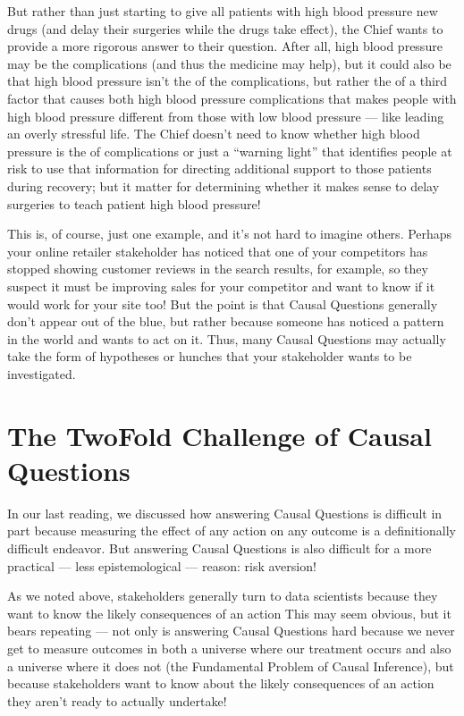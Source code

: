 \documentclass[letterpaper,10pt,english]{jupyterBook}
\begin{document}
\sphinxAtStartPar
But rather than just starting to give all patients with high blood pressure new drugs (and delay their surgeries while the drugs take effect), the Chief wants  to provide a more rigorous answer to their question. After all, high blood pressure may be  the complications (and thus the medicine may help), but it could also be that high blood pressure isn’t the  of the complications, but rather the  of a third factor that causes both high blood pressure  complications that makes people with high blood pressure different from those with low blood pressure — like leading an overly stressful life. The Chief doesn’t need to know whether high blood pressure is the  of complications or just a “warning light” that identifies people at risk to use that information for directing additional support to those patients during recovery; but it  matter for determining whether it makes sense to delay surgeries to teach patient high blood pressure!

\sphinxAtStartPar
This is, of course, just one example, and it’s not hard to imagine others. Perhaps your online retailer stakeholder has noticed that one of your competitors has stopped showing customer reviews in the search results, for example, so they suspect it must be improving sales for your competitor and want to know if it would work for your site too! But the point is that Causal Questions generally don’t appear out of the blue, but rather because someone has noticed a pattern in the world and wants to act on it. Thus, many Causal Questions may actually take the form of hypotheses or hunches that your stakeholder wants to be investigated.


\section{The Two\sphinxhyphen{}Fold Challenge of Causal Questions}
\label{\detokenize{30_questions/35_using_causal_questions:the-two-fold-challenge-of-causal-questions}}
\sphinxAtStartPar
In our last reading, we discussed how answering Causal Questions is difficult in part because measuring the effect of any action on any outcome is a definitionally difficult endeavor. But answering Causal Questions is also difficult for a more practical — less epistemological — reason: risk aversion!

\sphinxAtStartPar
As we noted above, stakeholders generally turn to data scientists because they want to know the likely consequences of an action  This may seem obvious, but it bears repeating — not only is answering Causal Questions hard because we never get to measure outcomes in both a universe where our treatment occurs and also a universe where it does not (the Fundamental Problem of Causal Inference), but  because stakeholders want to know about the likely consequences of an action they aren’t ready to actually undertake!
\end{document}
